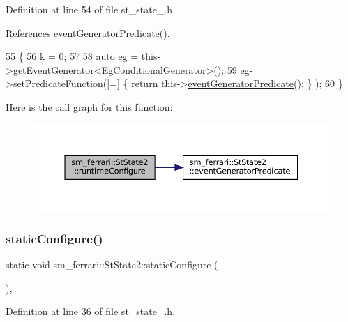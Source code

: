 Definition at line 54 of file st\+\_\+state\+\_.\+h.



References event\+Generator\+Predicate().


\begin{DoxyCode}
55         \{
56             \hyperlink{structsm__ferrari_1_1StState2_af43721743ea34cc998b16bc2857f85c3}{k} = 0;
57 
58             \textcolor{keyword}{auto} eg = this->getEventGenerator<EgConditionalGenerator>();
59             eg->setPredicateFunction([=] \{ \textcolor{keywordflow}{return} this->\hyperlink{structsm__ferrari_1_1StState2_ad4e53040b66600fdcfafcc1849ac82c7}{eventGeneratorPredicate}(); \}
      );
60         \}
\end{DoxyCode}
Here is the call graph for this function\+:
\nopagebreak
\begin{figure}[H]
\begin{center}
\leavevmode
\includegraphics[width=350pt]{structsm__ferrari_1_1StState2_a9bcdeff671e5e19eb07a32bedca1f161_cgraph}
\end{center}
\end{figure}
\mbox{\label{structsm__ferrari_1_1StState2_a7767abca55071ed12ae3334b0a720c7c}} 
\subsubsection{\texorpdfstring{static\+Configure()}{staticConfigure()}}
{\footnotesize\ttfamily static void sm\+\_\+ferrari\+::\+St\+State2\+::static\+Configure (\begin{DoxyParamCaption}{ }\end{DoxyParamCaption})\hspace{0.3cm}{\ttfamily [inline]}, {\ttfamily [static]}}



Definition at line 36 of file st\+\_\+state\+\_.\+h.


